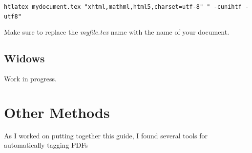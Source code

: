 \documentclass[lang=en]{article}
\newcommand{\code}[1]{\colorbox{light-gray}{\texttt{#1}}}
\begin{document}
\code{htlatex mydocument.tex "xhtml,mathml,html5,charset=utf-8" " -cunihtf -utf8"}

Make sure to replace the \textit{myfile.tex} name with the name of your
document.


\subsection{Widows}

Work in progress.


\section{Other Methods}

As I worked on putting together this guide, I found several tools for
automatically tagging PDFs







\end{document}

